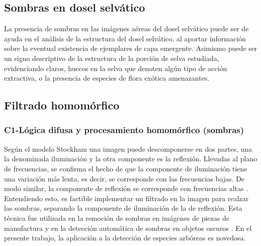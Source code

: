 \subsection{Sombras en dosel selvático}
La presencia de sombras en las imágenes aéreas del dosel selvático puede ser de ayuda en el análisis de la estructura del dosel selvático, al aportar información sobre la eventual existencia de ejemplares de capa emergente. Asimismo puede ser un signo descriptivo de la estructura de la porción de selva estudiada, evidenciando claros, huecos en la selva que denoten algún tipo de acción extractiva, o la presencia de especies de flora exótica amenazantes.
\subsection{Filtrado homomórfico }
\subsubsection{C1-Lógica difusa y procesamiento homomórfico (sombras)}
Según el modelo Stockham \cite{stockham_image_1972} una imagen puede descomponerse en dos partes, una la denominada iluminación y la otra componente es la reflexión. Llevadas al plano de frecuencias, se confirma el hecho de que la componente de iluminación tiene una variación más lenta, es decir, se corresponde con las frecuencias bajas. De modo similar, la componente de reflexión se corresponde con frecuencias altas \cite{oppenheim_nonlinear_1968}. Entendiendo esto, es factible implementar un filtrado en la imagen para realzar las sombras, separando la componente de iluminación de la de reflexión. Esta técnica fue utilizada en la remoción de sombras en imágenes de piezas de manufactura \cite{yang_research_2012} y en la detección automática de sombras en objetos oscuros \cite{etemadnia_automatic_2003}. En el presente trabajo, la aplicación a la detección de especies arbóreas es novedosa. 
